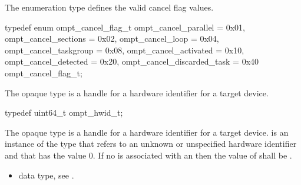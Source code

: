 \label{sec:ompt_cancel_flag_t}

\summary
The  enumeration type defines the valid cancel flag values.

\format
\begin{ccppspecific}
\begin{omptEnum}
typedef enum ompt_cancel_flag_t {
  ompt_cancel_parallel       = 0x01,
  ompt_cancel_sections       = 0x02,
  ompt_cancel_loop           = 0x04,
  ompt_cancel_taskgroup      = 0x08,
  ompt_cancel_activated      = 0x10,
  ompt_cancel_detected       = 0x20,
  ompt_cancel_discarded_task = 0x40
} ompt_cancel_flag_t;
\end{omptEnum}
\end{ccppspecific}



\label{sec:ompt_hwid_t}

\summary
The  opaque type is a handle for a hardware identifier 
for a target device.

\format
\begin{ccppspecific}
\begin{omptOther}
typedef uint64_t ompt_hwid_t;
\end{omptOther}
\end{ccppspecific}

\label{sec:ompt_hwid_none}
The  opaque type is a handle for a hardware identifier 
for a target device.  is an instance of the type
that refers to an unknown or unspecified hardware identifier and that
has the value 0. If no  is associated with an 
then the value of  shall be .

\crossreferences
\begin{itemize}
\item {} data type, 
see .
\end{itemize}
